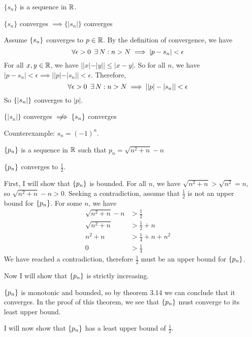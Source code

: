 \documentclass[11pt,letterpaper]{article}
\begin{document}
\begin{Problem}{3.1}
\begin{Hypothesis} $\{s_n\}$ is a sequence in $\mathbb{R}$. \end{Hypothesis} 
\begin{Claim} $\{s_n\}$ converges $\implies \{|s_n|\}$ converges \end{Claim}
\begin{Proof}
Assume $\left\{ s_n \right\}$ converges to $p\in\mathbb{R}$. By the definition of convergence, we have
\[ \forall \epsilon>0 \,\,\,\exists\, N : n>N \implies |p-s_n|<\epsilon \]
For all $x,y \in\mathbb{R}$, we have $||x|-|y|| \leq |x-y|$. So for all $n$, we have $|p-s_n|<\epsilon \implies ||p|-|s_n||<\epsilon$. Therefore,
\[ \forall \epsilon>0 \,\,\,\exists\, N : n>N \implies ||p|-|s_n||<\epsilon \]
So $\left\{ |s_n| \right\}$ converges to $|p|$. 
\end{Proof}
\begin{Claim} $\{|s_n|\}$ converges $\NotImplies \{s_n\}$ converges \end{Claim}
\begin{Proof}
Counterexample: $s_n = (-1)^n$.
\end{Proof}
\end{Problem}

\begin{Problem}{3.2}
\begin{Hypothesis} $\left\{ p_n \right\}$ is a sequence in $\mathbb{R}$ such that $p_n = \sqrt{n^2 + n} - n$ \end{Hypothesis}
\begin{Claim} $\left\{ p_n \right\}$ converges to $\frac{1}{2}$. \end{Claim}
\begin{Proof}
First, I will show that $\left\{ p_n \right\}$ is bounded. For all $n$, we have $\sqrt{n^2+n}>\sqrt{n^2}=n$, so $\sqrt{n^2 + n} - n > 0$. Seeking a contradiction, assume that $\frac{1}{2}$ is not an upper bound for $\left\{ p_n \right\}$. For some $n$, we have
\begin{align*}
    \sqrt{n^2 + n} - n &> \frac{1}{2} \\
    \sqrt{n^2 + n} &> \frac{1}{2} + n \\
    n^2 + n &> \frac{1}{4} + n + n^2 \\
    0 &> \frac{1}{4}
\end{align*}
We have reached a contradiction, therefore $\frac{1}{2}$ must be an upper bound for $\left\{ p_n \right\}$.

\begin{Todo} Now I will show that $\left\{ p_n \right\}$ is strictly increasing. \end{Todo}

$\left\{ p_n \right\}$ is monotonic and bounded, so by theorem 3.14 we can conclude that it converges. In the proof of this theorem, we see that $\left\{ p_n \right\}$ must converge to its least upper bound. 

\begin{Todo} I will now show that $\left\{ p_n \right\}$ has a least upper bound of $\frac{1}{2}$. \end{Todo}
\end{Proof}
\end{Problem}
\end{document}
